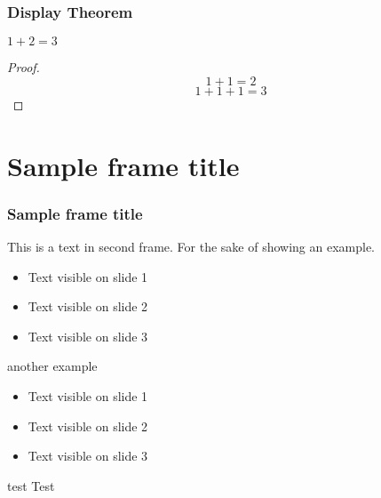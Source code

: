 \documentclass[aspectratio=169]{beamer}
\begin{document}
    \begin{frame}
        \frametitle{Display Theorem}
        \begin{theorem}
            $1 + 2 = 3$
        \end{theorem}
        \begin{proof}
            $$1 + 1 = 2$$
            $$1 + 1 + 1 = 3$$
        \end{proof}
    \end{frame}

    \section{Sample frame title}

    \begin{frame}
        \frametitle{Sample frame title}
        This is a text in second frame.
        For the sake of showing an example.

        \begin{itemize}
            \item Text visible on slide 1
            \item Text visible on slide 2
            \item Text visible on slide 3
        \end{itemize}

        \vspace{0.3cm}

        another example

        \begin{itemize}
            \itemsep0em
            \item Text visible on slide 1
            \item Text visible on slide 2
            \item Text visible on slide 3
        \end{itemize}
        \begin{exampleblock}{test}
            Test
        \end{exampleblock}

    \end{frame}
\end{document}

